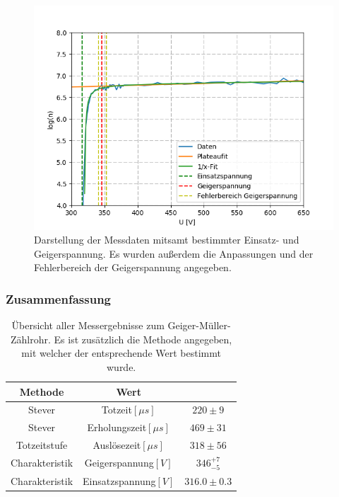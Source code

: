 \documentclass[12pt,a4paper]{article}
\begin{document}
\begin{figure}
\centering
\includegraphics[scale=1]{Bilder/GMlog.PNG}
\caption{Darstellung der Messdaten mitsamt bestimmter Einsatz- und Geigerspannung. Es wurden außerdem die Anpassungen und der Fehlerbereich der Geigerspannung angegeben.}
\label{fig:GMCharakteristik}
\end{figure}
\newpage
\subsubsection{Zusammenfassung}

\begin{table}
\center
\begin{tabular}{|c||c|c|}
\hline 
Methode & Wert &  \\ 
\hline 
Stever & Totzeit$[\mu s]$ & $220\pm 9$ \\ 
\hline 
Stever & Erholungszeit$[\mu s]$ & $469\pm 31$ \\ 
\hline 
Totzeitstufe & Auslösezeit$[\mu s]$ & $318\pm 56$ \\ 
\hline 
Charakteristik & Geigerspannung$[V]$ & $346_{-5}^{+7}$ \\ 
\hline 
Charakteristik & Einsatzspannung$[V]$ & $316.0\pm 0.3$\\ 
\hline 
\end{tabular} 
\caption{Übersicht aller Messergebnisse zum Geiger-Müller-Zählrohr. Es ist zusätzlich die Methode angegeben, mit welcher der entsprechende Wert bestimmt wurde.}
\label{GMzusammenfassung}
\end{table}
\end{document}
